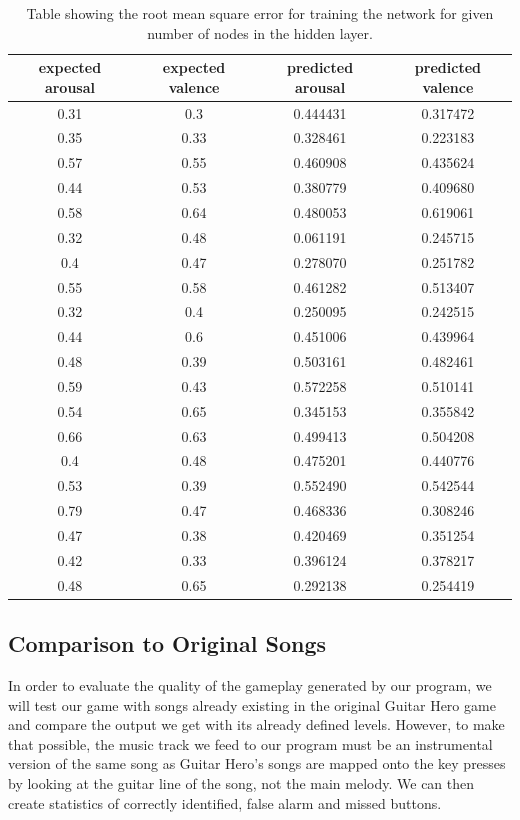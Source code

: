 \begin{table}
\begin{center}
\begin{tabular}{| c | c | c | c | } \hline 
 expected arousal & expected valence & predicted arousal & predicted valence \\ \hline \hline

0.31  & 	0.3    &  0.444431 &  0.317472   \\ \hline
0.35	&  0.33  &  0.328461 &  0.223183   \\ \hline
0.57	&  0.55  &  0.460908 &  0.435624   \\ \hline
0.44	&  0.53  &  0.380779 &  0.409680   \\ \hline
0.58	&  0.64  &  0.480053 &  0.619061   \\ \hline
0.32	&  0.48  &  0.061191  &  0.245715  \\ \hline
0.4	&  0.47  &  0.278070 &  0.251782   \\ \hline
0.55	&  0.58  &  0.461282 &  0.513407   \\ \hline
0.32	&  0.4    &  0.250095 &  0.242515   \\ \hline 
0.44	&  0.6    &  0.451006 &  0.439964   \\ \hline
0.48	&  0.39  &  0.503161 &  0.482461   \\ \hline
0.59	&  0.43  &  0.572258 &  0.510141   \\ \hline
0.54	&  0.65  &  0.345153 &  0.355842   \\ \hline
0.66	&  0.63  &  0.499413 &  0.504208   \\ \hline
0.4	&  0.48  &  0.475201 &  0.440776   \\ \hline
0.53	&  0.39  &  0.552490 &  0.542544   \\ \hline
0.79	&  0.47  &  0.468336 &  0.308246   \\ \hline
0.47	&  0.38  &  0.420469 &  0.351254   \\ \hline
0.42	&  0.33  &  0.396124 &  0.378217   \\ \hline
0.48	&  0.65  &  0.292138 &  0.254419   \\ \hline
\end{tabular}
\caption{Table showing the root mean square error for training the network for given number of nodes in the hidden layer.}
\label{table:rsmetable}
\end{center}
\end{table}


\subsection{Comparison to Original Songs}
In order to evaluate the quality of the gameplay generated by our program, we will test our game with songs already existing in the original Guitar Hero game and compare the output we get with its already defined levels. However, to make that possible, the music track we feed to our program must be an instrumental version of the same song as Guitar Hero's songs are mapped onto the key presses by looking at the guitar line of the song, not the main melody. We can then create statistics of correctly identified, false alarm and missed buttons.


